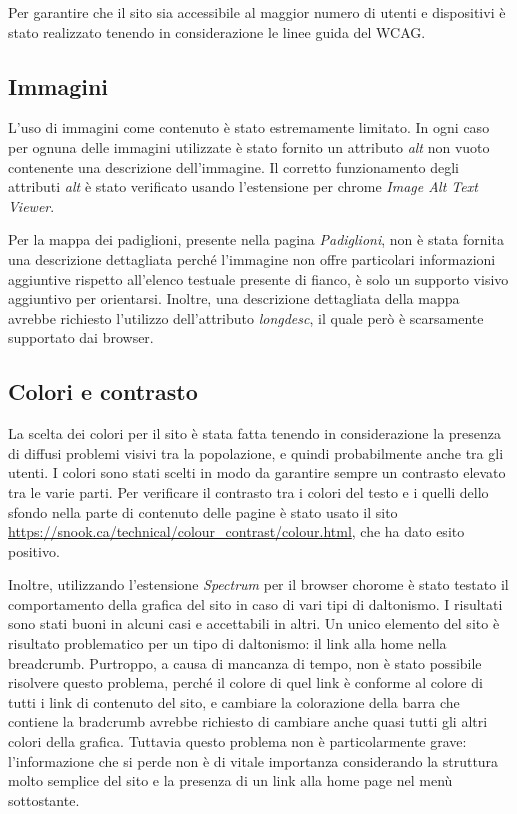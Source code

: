 Per garantire che il sito sia accessibile al maggior numero di utenti e dispositivi è stato realizzato tenendo in considerazione le linee guida del WCAG. \newline

\subsection{Immagini}
L'uso di immagini come contenuto è stato estremamente limitato. In ogni caso per ognuna delle immagini utilizzate è stato fornito un attributo \textit{alt} non vuoto contenente una descrizione dell'immagine. Il corretto funzionamento degli attributi \textit{alt} è stato verificato usando l'estensione per chrome \textit{Image Alt Text Viewer}.

Per la mappa dei padiglioni, presente nella pagina \textit{Padiglioni}, non è stata fornita una descrizione dettagliata perché l'immagine non offre particolari informazioni aggiuntive rispetto all'elenco testuale presente di fianco, è solo un supporto visivo aggiuntivo per orientarsi. Inoltre, una descrizione dettagliata della mappa avrebbe richiesto l'utilizzo dell'attributo \textit{longdesc}, il quale però è scarsamente supportato dai browser.

\subsection{Colori e contrasto}
La scelta dei colori per il sito è stata fatta tenendo in considerazione la presenza di diffusi problemi visivi tra la popolazione, e quindi probabilmente anche tra gli utenti. I colori sono stati scelti in modo da garantire sempre un contrasto elevato tra le varie parti. Per verificare il contrasto tra i colori del testo e i quelli dello sfondo nella parte di contenuto delle pagine è stato usato il sito \url{https://snook.ca/technical/colour_contrast/colour.html}, che ha dato esito positivo.

Inoltre, utilizzando l'estensione \textit{Spectrum} per il browser chorome è stato testato il comportamento della grafica del sito in caso di vari tipi di daltonismo. I risultati sono stati buoni in alcuni casi e accettabili in altri. Un unico elemento del sito è risultato problematico per un tipo di daltonismo: il link alla home nella breadcrumb. Purtroppo, a causa di mancanza di tempo, non è stato possibile risolvere questo problema, perché il colore di quel link è conforme al colore di tutti i link di contenuto del sito, e cambiare la colorazione della barra che contiene la bradcrumb avrebbe richiesto di cambiare anche quasi tutti gli altri colori della grafica. Tuttavia questo problema non è particolarmente grave: l'informazione che si perde non è di vitale importanza considerando la struttura molto semplice del sito e la presenza di un link alla home page nel menù sottostante.

